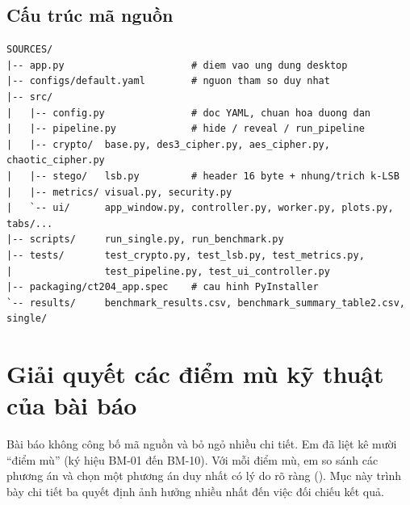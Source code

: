 \subsection{Cấu trúc mã nguồn}

\begin{lstlisting}[style=plain, caption={Cấu trúc thư mục mã nguồn}, label={lst:tree}]
SOURCES/
|-- app.py                      # diem vao ung dung desktop
|-- configs/default.yaml        # nguon tham so duy nhat
|-- src/
|   |-- config.py               # doc YAML, chuan hoa duong dan
|   |-- pipeline.py             # hide / reveal / run_pipeline
|   |-- crypto/  base.py, des3_cipher.py, aes_cipher.py, chaotic_cipher.py
|   |-- stego/   lsb.py         # header 16 byte + nhung/trich k-LSB
|   |-- metrics/ visual.py, security.py
|   `-- ui/      app_window.py, controller.py, worker.py, plots.py, tabs/...
|-- scripts/     run_single.py, run_benchmark.py
|-- tests/       test_crypto.py, test_lsb.py, test_metrics.py,
|                test_pipeline.py, test_ui_controller.py
|-- packaging/ct204_app.spec    # cau hinh PyInstaller
`-- results/     benchmark_results.csv, benchmark_summary_table2.csv, single/
\end{lstlisting}

\section{Giải quyết các điểm mù kỹ thuật của bài báo}
\label{sec:diemmu}

Bài báo không công bố mã nguồn và bỏ ngỏ nhiều chi tiết. Em đã liệt kê mười ``điểm mù''
(ký hiệu BM-01 đến BM-10). Với mỗi điểm mù, em so sánh các phương án và chọn một phương án duy
nhất có lý do rõ ràng (). Mục này trình bày chi tiết ba quyết định ảnh hưởng nhiều
nhất đến việc đối chiếu kết quả.

